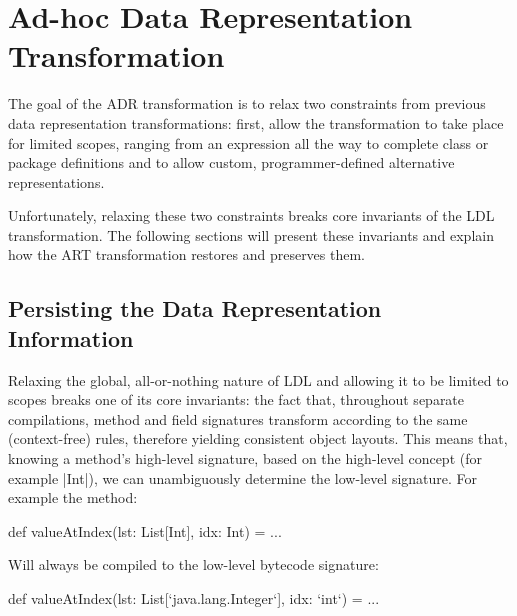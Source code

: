 \section{Ad-hoc Data Representation Transformation}
\label{sec:ildl}

The goal of the ADR transformation is to relax two constraints from previous data representation transformations: first, allow the transformation to take place for limited scopes, ranging from an expression all the way to complete class or package definitions and to allow custom, programmer-defined alternative representations.

Unfortunately, relaxing these two constraints breaks core invariants of the LDL transformation. The following sections will present these invariants and explain how the ART transformation restores and preserves them.

\subsection{Persisting the Data Representation Information}
\label{sec:ildl:signatures}

Relaxing the global, all-or-nothing nature of LDL and allowing it to be limited to scopes breaks one of its core invariants: the fact that, throughout separate compilations, method and field signatures transform according to the same (context-free) rules, therefore yielding consistent object layouts. This means that, knowing a method's high-level signature, based on the high-level concept (for example |Int|), we can unambiguously determine the low-level signature. For example the method:

\begin{lstlisting-nobreak}
def valueAtIndex(lst: List[Int], idx: Int) = ...
\end{lstlisting-nobreak}

Will always be compiled to the low-level bytecode signature:

\begin{lstlisting-nobreak}
def valueAtIndex(lst: List[`java.lang.Integer`], idx: `int`) = ...
\end{lstlisting-nobreak}

